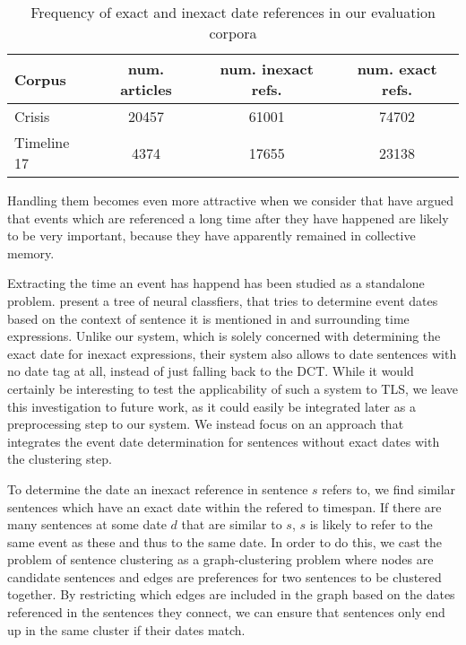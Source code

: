 \documentclass[a4paper,BCOR=10mm]{report}
\numberwithin{lemma}{chapter}
\numberwithin{definition}{chapter}
\begin{document}
\begin{table}
\begin{center}
\begin{tabular}{|l|c|c|c|}
\hline
\textbf{Corpus} & \textbf{num. articles} & \textbf{num. inexact refs.} & \textbf{num. exact refs.} \\\hline
Crisis & 20457 & 61001 & 74702 \\
Timeline 17 & 4374 & 17655 & 23138 \\\hline
\end{tabular}
\caption{Frequency of exact and inexact date references in our evaluation corpora}
\label{tab:ambigous-date-ref}
\end{center}
\end{table}


Handling them becomes even more attractive when we consider that \citet{datesel-graph} have argued that events which are referenced a long time after they have happened are likely to be very important, because they have apparently remained in collective memory. %

Extracting the time an event has happend has been studied as a standalone problem. \citet{event-time-extraction} present a tree of neural classfiers, that tries to determine event dates based on the context of sentence it is mentioned in and surrounding time expressions. Unlike our system, which is solely concerned with determining the exact date for inexact expressions, their system also allows to date sentences with no date tag at all, instead of just falling back to the DCT.
While it would certainly be interesting to test the applicability of such a system to TLS, we leave this investigation to future work, as it could easily be integrated later as a preprocessing step to our system.
We instead focus on an approach that integrates the event date determination for sentences without exact dates with the clustering step.

To determine the date an inexact reference in sentence $s$ refers to, we find similar sentences which have an exact date within the refered to timespan. If there are many sentences at some date $d$ that are similar to $s$, $s$ is likely to refer to the same event as these and thus to the same date. In order to do this, we cast the problem of sentence clustering as a graph-clustering problem where nodes are candidate sentences and edges are preferences for two sentences to be clustered together. By restricting which edges are included in the graph based on the dates referenced in the sentences they connect, we can ensure that sentences only end up in the same cluster if their dates match.
\end{document}
